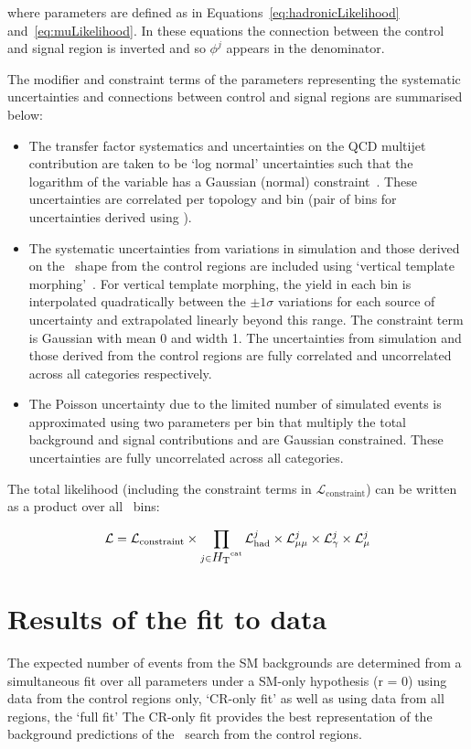 \noindent where parameters are defined as in Equations~\ref{eq:hadronicLikelihood} and~\ref{eq:muLikelihood}. 
In these equations the connection between the control and signal region is inverted
and so $\phi^{j}$ appears in the denominator. 

The modifier and constraint terms of the parameters representing the systematic uncertainties and 
connections between control and signal regions are summarised below:

\begin{itemize}
\item The transfer factor systematics and uncertainties on the QCD multijet contribution 
are taken to be `log normal' uncertainties such that the logarithm of the variable has 
a Gaussian (normal) constraint~\cite{templateMorphing}. These uncertainties are correlated per topology and \scalht bin 
(pair of \scalht bins for uncertainties derived using \mmj).
\item The systematic uncertainties from variations in simulation and those derived on the \mht~shape from the control regions 
are included using `vertical template morphing'~\cite{templateMorphing}. For vertical template morphing, the yield
in each bin is interpolated quadratically between the $\pm 1\sigma$ variations for each source of
uncertainty and extrapolated linearly beyond this range. The constraint term is Gaussian
with mean 0 and width 1. The uncertainties from simulation and those derived from the control regions
are fully correlated and uncorrelated across all categories respectively.
\item The Poisson uncertainty due to the limited number of simulated events is approximated using
two parameters per bin that multiply the total background and signal contributions and 
are Gaussian constrained. These uncertainties are fully uncorrelated across all categories.
\end{itemize}

The total likelihood (including the constraint terms in $\mathcal{L}_\mathrm{constraint}$) 
can be written as a product over all \htcat~bins:

\begin{equation}
\label{eq:totalLikelihood}
\mathcal{L} =  \mathcal{L}_\mathrm{constraint} \times \prod_{j\in\mbox{$H_\text{T}$}^{\text{cat}}} \mathcal{L}^{j}_{\mathrm{had}} \times \mathcal{L}^{j}_{\mathrm{\mu\mu}} 
\times \mathcal{L}^{j}_{\mathrm{\gamma}} \times \mathcal{L}^{j}_{\mathrm{\mu}}
\end{equation}


\section{Results of the fit to data}
\label{sec:results}
The expected number of events from the SM backgrounds are determined from 
a simultaneous fit over all parameters under a SM-only hypothesis (r = 0) using data from the control regions only, `CR-only fit' 
as well as using data from all regions, the `full fit'  The CR-only fit provides the 
best representation of the background predictions of the \alphat~search from the control regions.

